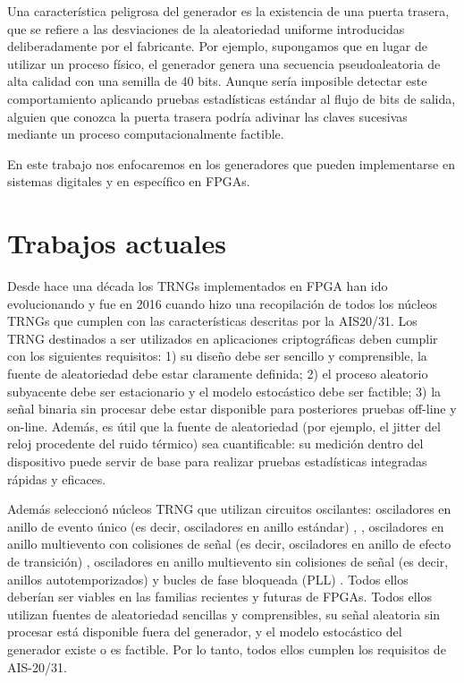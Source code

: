             Una característica peligrosa del generador es la existencia de una puerta trasera, que se refiere a las desviaciones de la aleatoriedad uniforme introducidas deliberadamente por el fabricante. Por ejemplo, supongamos que en lugar de utilizar un proceso físico, el generador genera una secuencia pseudoaleatoria de alta calidad con una semilla de 40 bits. Aunque sería imposible detectar este comportamiento aplicando pruebas estadísticas estándar al flujo de bits de salida, alguien que conozca la puerta trasera podría adivinar las claves sucesivas mediante un proceso computacionalmente factible. 


    En este trabajo nos enfocaremos en los generadores que pueden implementarse en sistemas digitales y en específico en FPGAs. 

    \section{Trabajos actuales}

        Desde hace una década los TRNGs implementados en FPGA han ido evolucionando y fue en 2016 cuando \cite{Petura2016} hizo una recopilación de todos los núcleos TRNGs que cumplen con las características descritas por la AIS20/31. Los TRNG destinados a ser utilizados en aplicaciones criptográficas deben cumplir con los siguientes requisitos: 1) su diseño debe ser sencillo y comprensible, la fuente de aleatoriedad debe estar claramente definida; 2) el proceso aleatorio subyacente debe ser estacionario y el modelo estocástico debe ser factible; 3) la señal binaria sin procesar debe estar disponible para posteriores pruebas off-line y on-line. Además, es útil que la fuente de aleatoriedad (por ejemplo, el jitter del reloj procedente del ruido térmico) sea cuantificable: su medición dentro del dispositivo puede servir de base para realizar pruebas estadísticas integradas rápidas y eficaces.

        Además seleccionó núcleos TRNG que utilizan circuitos oscilantes: osciladores en anillo de evento único (es decir, osciladores en anillo estándar) \cite{Baudet2010}, \cite{Kohlbrenner2004}, osciladores en anillo multievento con colisiones de señal (es decir, osciladores en anillo de efecto de transición) \cite{Varchola2010}, osciladores en anillo multievento sin colisiones de señal (es decir, anillos autotemporizados) \cite{Cherkaoui2013} y bucles de fase bloqueada (PLL) \cite{Fischer2003}. Todos ellos deberían ser viables en las familias recientes y futuras de FPGAs. Todos ellos utilizan fuentes de aleatoriedad sencillas y comprensibles, su señal aleatoria sin procesar está disponible fuera del generador, y el modelo estocástico del generador existe o es factible. Por lo tanto, todos ellos cumplen los requisitos de AIS-20/31.

